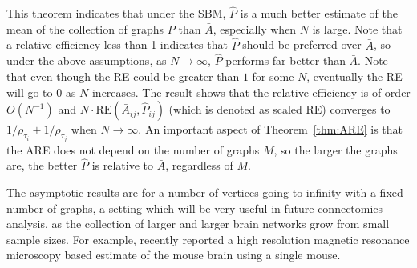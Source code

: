 \documentclass[journal,twoside,web]{ieeecolor}
\newcommand{\Ex}{\mathbb{E}}
\begin{document}




This theorem indicates that under the SBM, $\hat{P}$ is a much better estimate of the mean of the collection of graphs $P$ than $\bar{A}$, especially when $N$ is large.
Note that a relative efficiency less than 1 indicates that $\hat{P}$ should be preferred over $\bar{A}$, so under the above assumptions, as $N\to\infty$, $\hat{P}$ performs far better than $\bar{A}$.
Note that even though the RE could be greater than $1$ for some $N$, eventually the RE will go to 0 as $N$ increases.
The result shows that the relative efficiency is of order $O(N^{-1})$ and $N \cdot \mathrm{RE}(\bar{A}_{ij}, \hat{P}_{ij})$ (which is denoted as scaled RE) converges to $1/\rho_{\tau_i}+1/\rho_{\tau_j}$ when $N\to\infty$.
An important aspect of Theorem~\ref{thm:ARE} is that the ARE does not depend on the number of graphs $M$, so the larger the graphs are, the better $\hat{P}$ is relative to $\bar{A}$, regardless of $M$.

The asymptotic results are for a number of vertices going to infinity with a fixed number of graphs, a setting which will be very useful in future connectomics analysis, as the collection of larger and larger brain networks grow from small sample sizes.
For example, \cite{Calabrese2015} recently reported a high resolution magnetic resonance microscopy based estimate of the mouse brain using a single mouse.
\end{document}
